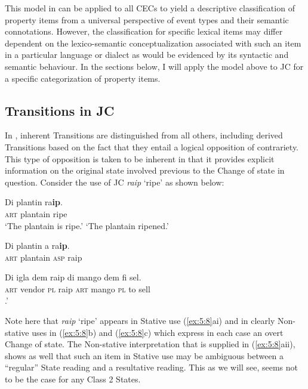 This model in  can be applied to all CECs to yield a descriptive classification of property items from a universal perspective of event types and their semantic connotations. However, the classification for specific lexical items may differ dependent on the lexico-semantic conceptualization associated with such an item in a particular language or dialect as would be evidenced by its syntactic and semantic behaviour. In the sections below, I will apply the model above to JC for a specific categorization of property items.


\subsection{Transitions in JC}\label{sec:5.2.1}

In , inherent Transitions are distinguished from all others, including derived Transitions based on the fact that they entail a logical opposition of contrariety. This type of opposition is taken to be inherent in that it provides explicit information on the original state involved previous to the Change of state in question. Consider the use of JC \textit{raip} `ripe' as shown below: 

\ea%
\label{ex:5:8}
\ea
\gll Di plantin ra\textbf{ip}.\\
\textsc{art} plantain ripe \\
 \ea ‘The plantain is ripe.’ 
 \ex `The plantain ripened.'
\z

\ex 
 \gll Di plantin a ra\textbf{ip}.\\
\textsc{art} plantain \textsc{asp} raip \\

\ex 
 \gll Di igla dem raip di mango dem fi sel.\\
\textsc{art} vendor {\textsc{pl}} raip \textsc{art} mango {\textsc{pl}} to sell \\
 .'
\z
\z

Note here that \textit{raip} `ripe' appears in Stative use (\ref{ex:5:8}ai) and in clearly Non-stative uses in (\ref{ex:5:8}b) and (\ref{ex:5:8}c) which express in each case an overt Change of state. The Non-stative interpretation that is supplied in (\ref{ex:5:8}aii), shows as well that such an item in Stative use may be ambiguous between a ``regular'' State reading and a resultative reading. This as we will see, seems not to be the case for any Class 2 States. 

